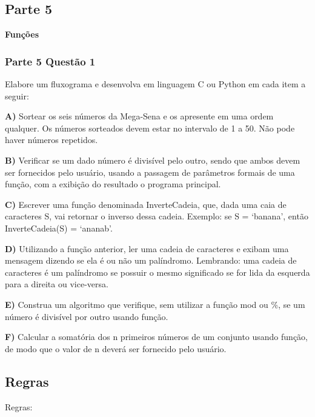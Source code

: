 \subsection*{Parte 5}

{\bfseries{Funções}}

\subsubsection*{Parte 5 Questão 1}

Elabore um fluxograma e desenvolva em linguagem C ou Python em cada item a seguir\+:


\begin{DoxyItemize}
\item {\bfseries{A)}} Sortear os seis números da Mega-\/\+Sena e os apresente em uma ordem qualquer. Os números sorteados devem estar no intervalo de 1 a 50. Não pode haver números repetidos.
\item {\bfseries{B)}} Verificar se um dado número é divisível pelo outro, sendo que ambos devem ser fornecidos pelo usuário, usando a passagem de parâmetros formais de uma função, com a exibição do resultado o programa principal.
\item {\bfseries{C)}} Escrever uma função denominada Inverte\+Cadeia, que, dada uma caia de caracteres S, vai retornar o inverso dessa cadeia. Exemplo\+: {\ttfamily se S = ‘banana’, então Inverte\+Cadeia(\+S) = ‘ananab’}.
\item {\bfseries{D)}} Utilizando a função anterior, ler uma cadeia de caracteres e exibam uma mensagem dizendo se ela é ou não um palíndromo. Lembrando\+: uma cadeia de caracteres é um palíndromo se possuir o mesmo significado se for lida da esquerda para a direita ou vice-\/versa.
\item {\bfseries{E)}} Construa um algoritmo que verifique, sem utilizar a função mod ou \%, se um número é divisível por outro usando função.
\item {\bfseries{F)}} Calcular a somatória dos n primeiros números de um conjunto usando função, de modo que o valor de n deverá ser fornecido pelo usuário.
\end{DoxyItemize}

\subsection*{Regras}

Regras\+:


